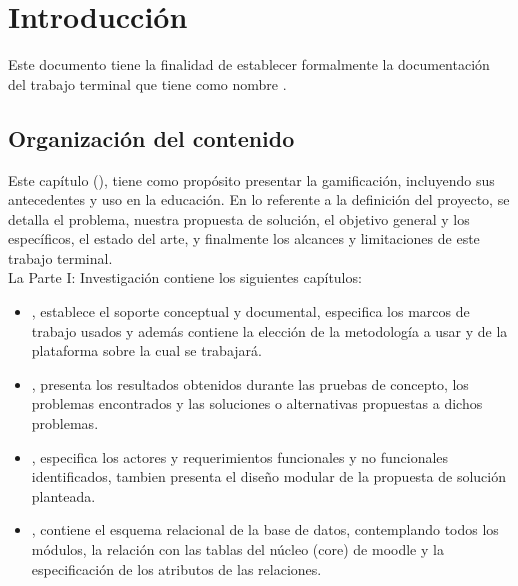 \chapter{Introducción}
\label{ch:introduccion}

Este documento tiene la finalidad de establecer formalmente la documentación del trabajo terminal {\numeroTT} que tiene como nombre {\bf\tituloTT}.

\section{Organización del contenido}

 Este capítulo (), tiene como propósito presentar la gamificación, incluyendo sus antecedentes y uso en la educación. En lo referente a la definición del proyecto, se detalla el problema, nuestra propuesta de solución, el objetivo general y los específicos, el estado del arte, y finalmente los alcances y limitaciones de este trabajo terminal.\\

 \noindent La {\pf Parte I: Investigación} contiene los siguientes capítulos:%

    \begin{itemize}
        \item {}, establece el soporte conceptual y documental, 
        especifica los marcos de trabajo usados y además contiene la elección de la 
        metodología a usar y de la plataforma sobre la cual se trabajará.
        
        \item {}, presenta los resultados obtenidos durante 
        las pruebas de concepto, los problemas encontrados y las soluciones o alternativas 
        propuestas a dichos problemas.
    
        \item {}, especifica los actores y requerimientos funcionales
        y no funcionales identificados, tambien presenta el diseño modular de la propuesta
        de solución planteada.
        
        \item {}, contiene el esquema relacional de la base de 
        datos, contemplando todos los módulos, la relación con las tablas del núcleo (core)
        de moodle y la especificación de los atributos de las relaciones.
    \end{itemize}

